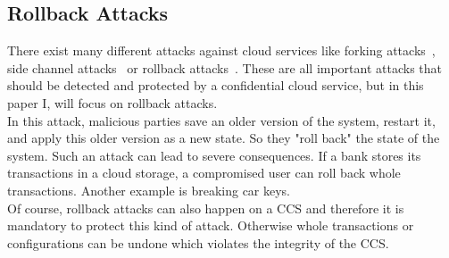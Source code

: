 \subsection{Rollback Attacks}
There exist many different attacks against cloud services like forking attacks~\cite{forkingAttacks}, side channel attacks~\cite{sideChannel} or rollback attacks~\cite{Rollback}. These are all important attacks that should be detected and protected by a confidential cloud service, but in this paper I, will focus on rollback attacks.\\
In this attack, malicious parties save an older version of the system, restart it, and apply this older version as a new state. So they "roll back" the state of the system. Such an attack can lead to severe consequences. If a bank stores its transactions in a cloud storage, a compromised user can roll back whole transactions. Another example is breaking car keys. \\%
Of course, rollback attacks can also happen on a CCS and therefore it is mandatory to protect this kind of attack. Otherwise whole transactions or configurations can be undone which violates the integrity of the CCS.